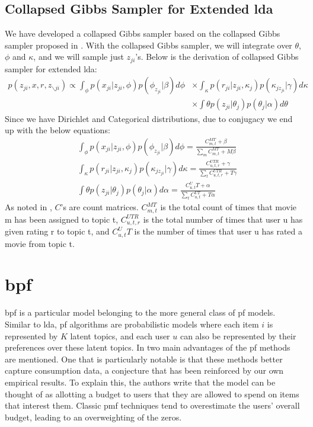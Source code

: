 \documentclass{article} %
\begin{document}
\label{sec:elda-sampler}
\subsection{Collapsed Gibbs Sampler for Extended \gls{lda}}
We have developed a collapsed Gibbs sampler based on the collapsed Gibbs sampler 
proposed in \cite{steyvers2007probabilistic}. With the collapsed Gibbs sampler, 
we will integrate over $\theta$, $\phi$ and $\kappa$, and we will sample just
$z_{ji}$'s. Below is the derivation of collapsed Gibbs sampler for extended 
\gls{lda}:
\begin{align*}
  p(z_{ji},x,r,z_{\backslash ji}) \propto 
  \int_{\phi} p(x_{ji}|z_{ji},\phi)p(\phi_{z_{ji}}|\beta)d\phi
  &\times \int_{\kappa} p(r_{ji}|z_{ji},\kappa_{j})p(\kappa_{jz_{ji}}|\gamma) d\kappa
  \\
  &\times \int{\theta} p(z_{ji}|\theta_{j})p(\theta_j|\alpha) d\theta
\end{align*}
Since we have Dirichlet and Categorical distributions, due to conjugacy we end 
up with the below equations:
\begin{align*}
  &\int_{\phi} p(x_{ji}|z_{ji},\phi)p(\phi_{z_{ji}}|\beta)d\phi = \frac{C_{m,t}^{MT}+\beta}{\sum_m C_{m,t}^{MT}+M\beta} 
  \\
  &\int_{\kappa} p(r_{ji}|z_{ji},\kappa_{j})p(\kappa_{jz_{ji}}|\gamma) d\kappa = \frac{C_{u,t,r}^{UTR}+\gamma}{\sum_t C_{u,t,r}^{UTR}+T\gamma} 
  \\
  &\int{\theta} p(z_{ji}|\theta_{j})p(\theta_j|\alpha) d\alpha = \frac{C_{u,t}^UT+\alpha}{\sum_t C_{u,t}^{UT}+T\alpha}
\end{align*}
As noted in \cite{steyvers2007probabilistic}, $C$'s are count matrices. $C_{m,t}^{MT}$ 
is the total count of times that movie m has been assigned to topic t, $C_{u,t,r}^{UTR}$ 
is the total number of times that user u has given rating r to topic t, and $C_{u,t}^UT$ 
is the number of times that user u has rated a movie from topic t. 

\section{\acrlong{bpf}}
\acrlong{bpf} is a particular model belonging to the more general class of \gls{pf} models. Similar to \gls{lda}, \gls{pf} algorithms are probabilistic models where each item $i$ is represented by $K$ latent topics, and each user $u$ can also be represented by their preferences over these latent topics. In \citep{gopalan2013scalable} two main advantages of the \gls{pf} methods are mentioned. One that is particularly notable is that these methods better capture consumption data, a conjecture that has been reinforced by our own empirical results. To explain this, the authors write that the model can be thought of as allotting a budget to users that they are allowed to spend on items that interest them. Classic \gls{pmf} techniques tend to overestimate the users' overall budget, leading to an overweighting of the zeros.
\end{document}
